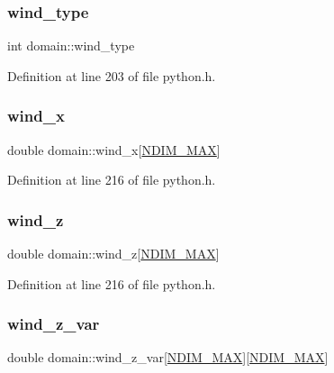 \mbox{\label{structdomain_a620d21c9cc0dfcb8ed1d9bbb07314daf}} 
\subsubsection{\texorpdfstring{wind\+\_\+type}{wind\_type}}
{\footnotesize\ttfamily int domain\+::wind\+\_\+type}



Definition at line 203 of file python.\+h.

\mbox{\label{structdomain_a69ec5690bab03b53d2f061173c6bd6c6}} 
\subsubsection{\texorpdfstring{wind\+\_\+x}{wind\_x}}
{\footnotesize\ttfamily double domain\+::wind\+\_\+x\mbox{[}\hyperlink{python_8h_a80cccc8d22c78d3095c60ab2aedeb2a5}{N\+D\+I\+M\+\_\+\+M\+AX}\mbox{]}}



Definition at line 216 of file python.\+h.

\mbox{\label{structdomain_ac3bb48ac4731bd28193e92d66aa9868f}} 
\subsubsection{\texorpdfstring{wind\+\_\+z}{wind\_z}}
{\footnotesize\ttfamily double domain\+::wind\+\_\+z\mbox{[}\hyperlink{python_8h_a80cccc8d22c78d3095c60ab2aedeb2a5}{N\+D\+I\+M\+\_\+\+M\+AX}\mbox{]}}



Definition at line 216 of file python.\+h.

\mbox{\label{structdomain_a810ac3d68f86ad671b5500152cd83be2}} 
\subsubsection{\texorpdfstring{wind\+\_\+z\+\_\+var}{wind\_z\_var}}
{\footnotesize\ttfamily double domain\+::wind\+\_\+z\+\_\+var\mbox{[}\hyperlink{python_8h_a80cccc8d22c78d3095c60ab2aedeb2a5}{N\+D\+I\+M\+\_\+\+M\+AX}\mbox{]}\mbox{[}\hyperlink{python_8h_a80cccc8d22c78d3095c60ab2aedeb2a5}{N\+D\+I\+M\+\_\+\+M\+AX}\mbox{]}}



